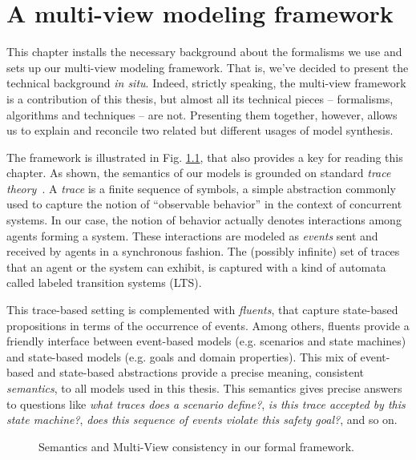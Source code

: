 \chapter{A multi-view modeling framework\label{chapter:framework}}

This chapter installs the necessary background about the formalisms we use and sets up our multi-view modeling framework. That is, we've decided to present the technical background \emph{in situ}. Indeed, strictly speaking, the multi-view framework is a contribution of this thesis, but almost all its technical pieces -- formalisms, algorithms and techniques -- are not. Presenting them together, however, allows us to explain and reconcile two related but different usages of model synthesis.

The framework is illustrated in Fig. \ref{image:framework}, that also provides a key for reading this chapter. As shown, the semantics of our models is grounded on standard \emph{trace theory}~\cite{Hoare:1985}. A \emph{trace} is a finite sequence of symbols, a simple abstraction commonly used to capture the notion of ``observable behavior'' in the context of concurrent systems. In our case, the notion of behavior actually denotes interactions among agents forming a system. These interactions are modeled as \emph{events} sent and received by agents in a synchronous fashion. The (possibly infinite) set of traces that an agent or the system can exhibit, is captured with a kind of automata called labeled transition systems (LTS).

This trace-based setting is complemented with \emph{fluents}, that capture state-based propositions in terms of the occurrence of events. Among others, fluents provide a friendly interface between event-based models (e.g. scenarios and state machines) and state-based models (e.g. goals and domain properties). This mix of event-based and state-based abstractions provide a precise meaning, consistent \emph{semantics}, to all models used in this thesis. This semantics gives precise answers to questions like \emph{what traces does a scenario define?}, \emph{is this trace accepted by this state machine?}, \emph{does this sequence of events violate this safety goal?}, and so on.

\begin{figure}[t]\centering
  \caption{Semantics and Multi-View consistency in our formal framework.\label{image:framework}}
\end{figure}

